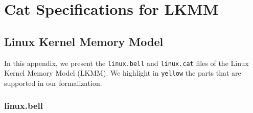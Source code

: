 \chapter{Cat Specifications for LKMM}
\label{app:lkmm-cat-specifications}

\section{Linux Kernel Memory Model}

\newcommand{\supported}[1]{\hl{#1}}





In this appendix, we present the \texttt{linux.bell} and \texttt{linux.cat} files of the Linux Kernel Memory Model (LKMM).
We highlight in \texttt{yellow} the parts that are supported in our formalization.

\subsection{linux.bell}
\label{app:cat-bell}

